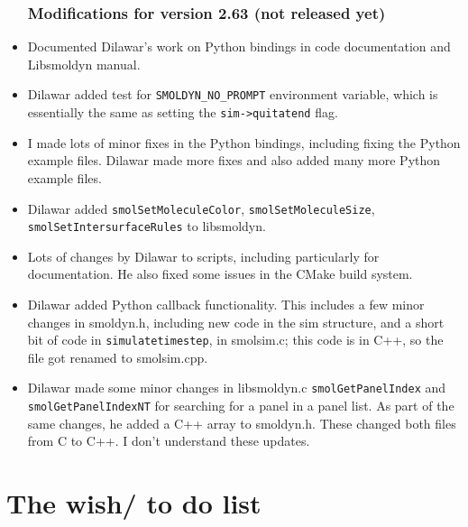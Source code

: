 \documentclass {book}
\newcommand {\ttt} {\texttt}
\begin{document}
\begin{itemize}
\subsection*{Modifications for version 2.63 (not released yet)}
\item Documented Dilawar's work on Python bindings in code documentation and Libsmoldyn manual.
\item Dilawar added test for \ttt{SMOLDYN\_NO\_PROMPT} environment variable, which is essentially the same as setting the \ttt{sim->quitatend} flag.
\item I made lots of minor fixes in the Python bindings, including fixing the Python example files. Dilawar made more fixes and also added many more Python example files.
\item Dilawar added \ttt{smolSetMoleculeColor}, \ttt{smolSetMoleculeSize}, \ttt{smolSetIntersurfaceRules} to libsmoldyn.
\item Lots of changes by Dilawar to scripts, including particularly for documentation. He also fixed some issues in the CMake build system.
\item Dilawar added Python callback functionality. This includes a few minor changes in smoldyn.h, including new code in the sim structure, and a short bit of code in \ttt{simulatetimestep}, in smolsim.c; this code is in C++, so the file got renamed to smolsim.cpp.
\item Dilawar made some minor changes in libsmoldyn.c \ttt{smolGetPanelIndex} and \ttt{smolGetPanelIndexNT} for searching for a panel in a panel list. As part of the same changes, he added a C++ array to smoldyn.h. These changed both files from C to C++. I don't understand these updates.


\end{itemize}


\chapter{The wish/ to do list}

\end{document}
